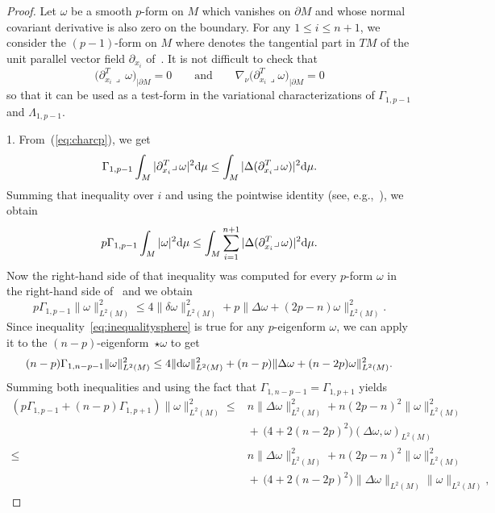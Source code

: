 \documentclass[10pt,a4paper]{amsart}
\numberwithin{equation}{section}
\theoremstyle{definition}
\begin{document}
\begin{proof} Let $\omega$ be a smooth $p$-form on $M$ which vanishes on $\partial M$ and whose normal covariant derivative is also zero on the boundary.
For any $1\leq i\leq n+1$, we consider the $(p-1)$-form  on $M$ where  denotes the tangential part in $TM$ of the unit parallel vector field $\partial_{x_i}$ of~. It is not difficult to check that
\[
\bigl(\partial_{x_i}^T\lrcorner\,\omega\bigr)_{|\partial M}=0\qquad\text{and}\qquad\nabla_{\nu}\bigl(\partial_{x_i}^T\lrcorner\omega\bigr)_{|\partial M}=0
\]
so that it can be used as a test-form in the variational characterizations of $\Gamma_{1,p-1}$ and $\Lambda_{1,p-1}$.

1. From~(\ref{eq:charcp}), we get
\[
\Gamma_{1,p-1}\int_M|\partial_{x_i}^T\lrcorner\,\omega|^2 {\rm d}\mu\leq\int_M|\Delta(\partial_{x_i}^T\lrcorner\,\omega)|^2{\rm d}\mu.
\]
Summing that inequality over $i$ and using the pointwise identity  (see, e.g.,~\cite[equation~(22)]{EGHM}), we obtain
\[
p\Gamma_{1,p-1}\int_M|\omega|^2 {\rm d}\mu\leq\int_M\sum_{i=1}^{n+1}|\Delta(\partial_{x_i}^T\lrcorner\,\omega)|^2{\rm d}\mu.
\]
Now the right-hand side of that inequality was computed for every $p$-form $\omega$ in the right-hand side of~\cite[equations~(31) and (33)]{EGHM} and we obtain
\begin{equation}\label{eq:inequalitysphere}
p\Gamma_{1,p-1} \|\omega\|^2_{L^2(M)} \leq 4\|\delta\omega\|^2_{L^2(M)}+p\|\Delta\omega+(2p-n)\omega\|^2_{L^2(M)}.
\end{equation}
Since inequality~\eqref{eq:inequalitysphere} is true for any $p$-eigenform $\omega$, we can apply it to the $(n-p)$-eigenform~$\star\omega$ to get
\[
(n-p) \Gamma_{1,n-p-1} \|\omega\|^2_{L^2(M)}\leq 4\|{\rm d}\omega\|^2_{L^2(M)}+(n-p)\|\Delta\omega+(n-2p)\omega\|^2_{L^2(M)}.
\]
Summing both inequalities and using the fact that $\Gamma_{1,n-p-1}=\Gamma_{1,p+1}$ yields
\begin{align*}%
 \left(p \Gamma_{1,p-1}+ (n-p) \Gamma_{1,p+1}\right)\|\omega\|^2_{L^2(M)} \leq{}& n\|\Delta\omega\|^2_{L^2(M)}+n(2p-n)^2\|\omega\|^2_{L^2(M)}\nonumber\\
&{}{+}\,\bigl(4+2(n-2p)^2\bigr) (\Delta\omega,\omega)_{L^2(M)}\nonumber\\
\leq{}& n\|\Delta\omega\|^2_{L^2(M)}+n(2p-n)^2\|\omega\|^2_{L^2(M)}\nonumber\\
&{}{+}\,\bigl(4+2(n-2p)^2\bigr) \|\Delta\omega\|_{L^2(M)}\|\omega\|_{L^2(M)},\nonumber

\end{align*}
\end{proof}
\end{document}
